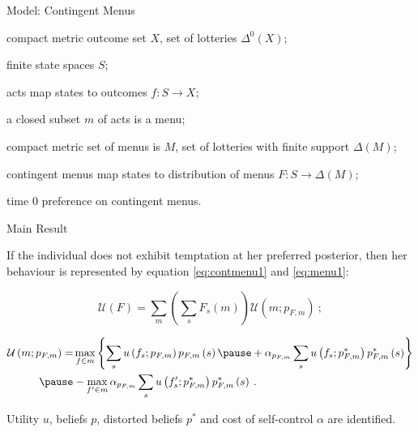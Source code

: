 \documentclass[usenames,dvipsnames,aspectratio=169,11pt, envcountsect]{beamer}
\begin{document}
\begin{frame}{Model: Contingent Menus}
	\begin{wideitemize}
		\item
		compact metric outcome set \(X\), set of lotteries \(\Delta^{0} \left( X \right)\); \pause
		\item
		finite state spaces \(S\); \pause
		\item
		acts map states to outcomes \(f: S \longrightarrow X \); \pause
		\item
		a closed subset \(m\) of acts is a menu; \pause
		\item
		compact metric set of menus is \(M\), set of lotteries with finite support \(\Delta \left( M \right)\); \pause
		\item
		contingent menus map states to distribution of menus \(F: S \rightarrow \Delta \left( M \right) \); \pause
		\item
		time \(0\) preference on contingent menus.
	\end{wideitemize}
\end{frame}

\begin{frame}{Main Result}

	If the individual does not exhibit temptation at her preferred posterior, then her behaviour is represented by equation \ref{eq:contmenu1} and \ref{eq:menu1}:

	\vfill

	\begin{equation}\label{eq:contmenu1}
		\mathscr{U}(F)= \sum_{m} \left( \sum_{s} F_{s} \left( m \right) \right) \mathcal{U} \left(m ; p_{F,m} \right) \: ;
	\end{equation} \pause

	\begin{equation}\label{eq:menu1}
		\begin{aligned}
			\mathcal{U} \left(m ; p_{F,m} \right) = & \max _{f \in m}\left\{\sum_{s} u \left( f_{s} ; p_{F,m} \right) p_{F,m} \left( s \right) \pause + \alpha _{p_{F,m}} \sum_{s} u \left( f_{s} ; p^{*}_{F,m} \right) p^{*}_{F,m} \left( s \right) \right\} \\ \pause
			                                        & -\max _{f^{\prime} \in m} \alpha _{p_{F,m}} \sum_{s} u\left(f^{\prime}_{s} ; p^{*}_{F,m} \right) p^{*}_{F,m} \left( s \right) \: .
		\end{aligned}
	\end{equation}

	Utility \( u \), beliefs \( p \), distorted beliefs \( p^{*} \) and cost of self-control \( \alpha \) are identified.

\end{frame}
\end{document}
